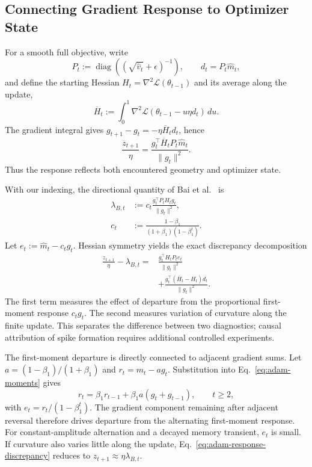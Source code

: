 \subsection{Connecting Gradient Response to Optimizer State}

For a smooth full objective, write
\begin{equation}
P_t:=\operatorname{diag}
\left((\sqrt{\widehat v_t}+\epsilon)^{-1}\right),
\qquad d_t=P_t\widehat m_t,
\end{equation}
and define the starting Hessian $H_t=\nabla^2\mathcal L(\theta_{t-1})$
and its average along the update,
\begin{equation}
\overline H_t:=
\int_0^1\nabla^2\mathcal L(\theta_{t-1}-u\eta d_t)\,du.
\end{equation}
The gradient integral gives
$g_{t+1}-g_t=-\eta\overline H_td_t$, hence
\begin{equation}
\frac{z_{t+1}}{\eta}
=
\frac{g_t^\top\overline H_tP_t\widehat m_t}{\|g_t\|^2}.
\label{eq:adam-response-integral}
\end{equation}
Thus the response reflects both encountered geometry and optimizer state.

With our indexing, the directional quantity of
Bai et al.~\cite{bai2026adaptive} is
\begin{equation}
\begin{aligned}
\lambda_{B,t}
&:=c_t\frac{g_t^\top P_tH_tg_t}{\|g_t\|^2},\\
c_t&:=\frac{1-\beta_1}{(1+\beta_1)(1-\beta_1^t)}.
\end{aligned}
\label{eq:adam-bai-reference}
\end{equation}
Let $e_t:=\widehat m_t-c_tg_t$. Hessian symmetry yields the exact
discrepancy decomposition
\begin{equation}
\begin{aligned}
\frac{z_{t+1}}{\eta}-\lambda_{B,t}
={}&\frac{g_t^\top H_tP_te_t}{\|g_t\|^2}\\
&+\frac{g_t^\top(\overline H_t-H_t)d_t}{\|g_t\|^2}.
\end{aligned}
\label{eq:adam-response-discrepancy}
\end{equation}
The first term measures the effect of departure from the proportional
first-moment response $c_tg_t$. The second measures variation of curvature
along the finite update. This separates the difference between two
diagnostics; causal attribution of spike formation requires additional
controlled experiments.

The first-moment departure is directly connected to adjacent gradient
sums. Let $a=(1-\beta_1)/(1+\beta_1)$ and $r_t=m_t-ag_t$. Substitution
into Eq.~\eqref{eq:adam-moments} gives
\begin{equation}
r_t=\beta_1r_{t-1}+\beta_1a(g_t+g_{t-1}),
\qquad t\ge2,
\label{eq:adam-memory-residual}
\end{equation}
with $e_t=r_t/(1-\beta_1^t)$. The gradient component remaining after
adjacent reversal therefore drives departure from the alternating
first-moment response. For constant-amplitude alternation and a decayed
memory transient, $e_t$ is small. If curvature also varies little along
the update, Eq.~\eqref{eq:adam-response-discrepancy} reduces to
$z_{t+1}\approx\eta\lambda_{B,t}$.

